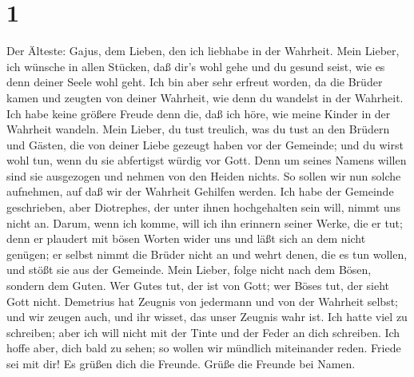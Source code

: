\hypertarget{section}{%
\section{1}\label{section}}

 Der Älteste: Gajus, dem Lieben, den ich liebhabe in der
Wahrheit.  Mein Lieber, ich wünsche in allen Stücken, daß
dir's wohl gehe und du gesund seist, wie es denn deiner Seele wohl geht.
 Ich bin aber sehr erfreut worden, da die Brüder kamen und
zeugten von deiner Wahrheit, wie denn du wandelst in der Wahrheit.
 Ich habe keine größere Freude denn die, daß ich höre, wie
meine Kinder in der Wahrheit wandeln.  Mein Lieber, du tust
treulich, was du tust an den Brüdern und Gästen,  die von
deiner Liebe gezeugt haben vor der Gemeinde; und du wirst wohl tun, wenn
du sie abfertigst würdig vor Gott.  Denn um seines Namens
willen sind sie ausgezogen und nehmen von den Heiden nichts.
 So sollen wir nun solche aufnehmen, auf daß wir der
Wahrheit Gehilfen werden.  Ich habe der Gemeinde
geschrieben, aber Diotrephes, der unter ihnen hochgehalten sein will,
nimmt uns nicht an.  Darum, wenn ich komme, will ich ihn
erinnern seiner Werke, die er tut; denn er plaudert mit bösen Worten
wider uns und läßt sich an dem nicht genügen; er selbst nimmt die Brüder
nicht an und wehrt denen, die es tun wollen, und stößt sie aus der
Gemeinde.  Mein Lieber, folge nicht nach dem Bösen, sondern
dem Guten. Wer Gutes tut, der ist von Gott; wer Böses tut, der sieht
Gott nicht.  Demetrius hat Zeugnis von jedermann und von
der Wahrheit selbst; und wir zeugen auch, und ihr wisset, das unser
Zeugnis wahr ist.  Ich hatte viel zu schreiben; aber ich
will nicht mit der Tinte und der Feder an dich schreiben. 
Ich hoffe aber, dich bald zu sehen; so wollen wir mündlich miteinander
reden. Friede sei mit dir! Es grüßen dich die Freunde. Grüße die Freunde
bei Namen.
